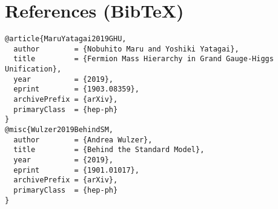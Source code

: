 \documentclass[11pt]{article}
\begin{document}
  \section*{References (Bib\TeX)}
  \begin{verbatim}
@article{MaruYatagai2019GHU,
  author        = {Nobuhito Maru and Yoshiki Yatagai},
  title         = {Fermion Mass Hierarchy in Grand Gauge-Higgs Unification},
  year          = {2019},
  eprint        = {1903.08359},
  archivePrefix = {arXiv},
  primaryClass  = {hep-ph}
}
@misc{Wulzer2019BehindSM,
  author        = {Andrea Wulzer},
  title         = {Behind the Standard Model},
  year          = {2019},
  eprint        = {1901.01017},
  archivePrefix = {arXiv},
  primaryClass  = {hep-ph}
}
  \end{verbatim}




  \ifdefined\standalonechapter\else
  
  
\end{document}
